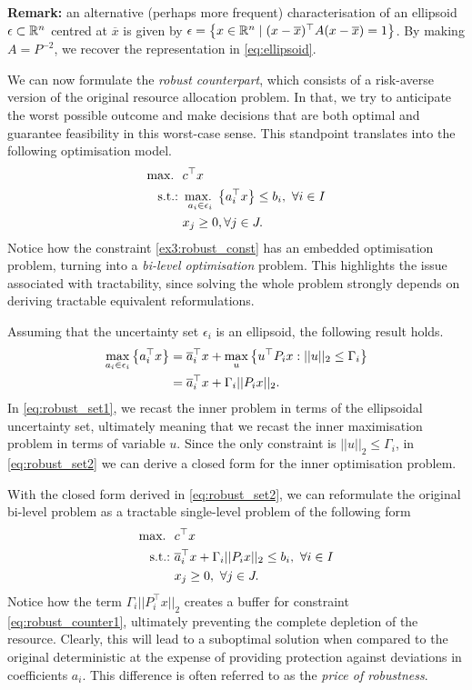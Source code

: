 {\bf Remark:} an alternative (perhaps more frequent) characterisation of an ellipsoid $\epsilon \subset \mathbb{R}^n$ centred at $\overline{x}$ is given by $\epsilon = \left\{ x \in \mathbb{R}^n \mid (x - \overline{x})^\top A(x - \overline{x}) = 1 \right \}$. By making $A = P^{-2}$, we recover the representation in \eqref{eq:ellipsoid}.

We can now formulate the \emph{robust counterpart}, which consists of a risk-averse version of the original resource allocation problem. In that, we try to anticipate the worst possible outcome and make decisions that are both optimal and guarantee feasibility in this worst-case sense. This standpoint translates into the following optimisation model.
%
\begin{align}
	\mathop{\text{max.~}} \ &  c^\top x \nonumber \\
	\mathop{\text{s.t.:~}} & \mathop{\text{max.~}}_{a_{i} \in \epsilon_i}\left\{ a_i^\top x \right \} \leq b_i, \ \forall i \in I \label{ex3:robust_const}\\
	& x_j \geq 0, \forall j \in J. \nonumber
\end{align}
%
Notice how the constraint \eqref{ex3:robust_const} has an embedded optimisation problem, turning into a \emph{bi-level optimisation} problem. This highlights the issue associated with tractability, since solving the whole problem strongly depends on deriving tractable equivalent reformulations.

Assuming that the uncertainty set $\epsilon_i$ is an ellipsoid, the following result holds.
%
\begin{align}
	\max_{a_{i} \in \epsilon_i}\left\{ a_i^\top x \right \}  & = \overline{a}_i^\top x + \max_u\left\{ u^\top P_i x : ||u||_2 \leq \Gamma_i \right \} \label{eq:robust_set1}\\
	& = \overline{a}_i^\top x + \Gamma_i||P_i x||_2. \label{eq:robust_set2}
\end{align}
%
In \eqref{eq:robust_set1}, we recast the inner problem in terms of the ellipsoidal uncertainty set, ultimately meaning that we recast the inner maximisation problem in terms of variable $u$. Since the only constraint is $||u||_2 \leq \Gamma_i$, in \eqref{eq:robust_set2} we can derive a closed form for the inner optimisation problem.

With the closed form derived in \eqref{eq:robust_set2}, we can reformulate the original bi-level problem as a tractable single-level problem of the following form
%
\begin{align}
	\maxi \ &  c^\top x \nonumber \\
	\st & \overline{a}_i^\top x + \Gamma_i||P_i x||_2 \leq b_i, \ \forall i \in I \label{eq:robust_counter1}\\
	& x_j \geq 0, \ \forall j \in J. \nonumber
\end{align} 
%
Notice how the term $\Gamma_i||P_i^\top x||_2$ creates a buffer for constraint \eqref{eq:robust_counter1}, ultimately preventing the complete depletion of the resource. Clearly, this will lead to a suboptimal solution when compared to the original deterministic at the expense of providing protection against deviations in coefficients $a_i$. This difference is often referred to as the \emph{price of robustness}.

